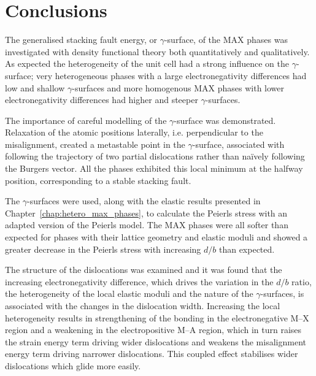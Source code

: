 \section{Conclusions}

The generalised stacking fault energy, or $\gamma$-surface, of the MAX phases was investigated with density functional theory both quantitatively and qualitatively. As expected the heterogeneity of the unit cell had a strong influence on the $\gamma$-surface; very heterogeneous phases with a large electronegativity differences had low and shallow $\gamma$-surfaces and more homogenous MAX phases with lower electronegativity differences had higher and steeper $\gamma$-surfaces.

The importance of careful modelling of the $\gamma$-surface was demonstrated. Relaxation of the atomic positions laterally, i.e. perpendicular to the misalignment, created a metastable point in the $\gamma$-surface, associated with following the trajectory of two partial dislocations rather than na\"{i}vely following the Burgers vector. All the phases exhibited this local minimum at the halfway position, corresponding to a stable stacking fault.

The $\gamma$-surfaces were used, along with the elastic results presented in Chapter~\ref{chap:hetero_max_phases}, to calculate the Peierls stress with an adapted version of the Peierls model. The MAX phases were all softer than expected for phases with their lattice geometry and elastic moduli and showed a greater decrease in the Peierls stress with increasing $d/b$ than expected.

The structure of the dislocations was examined and it was found that the increasing electronegativity difference, which drives the variation in the $d/b$ ratio, the heterogeneity of the local elastic moduli and the nature of the $\gamma$-surfaces, is associated with the changes in the dislocation width. Increasing the local heterogeneity results in strengthening of the bonding in the electronegative M--X region and a weakening in the electropositive M--A region, which in turn raises the strain energy term driving wider dislocations and weakens the misalignment energy term driving narrower dislocations. This coupled effect stabilises wider dislocations which glide more easily.


